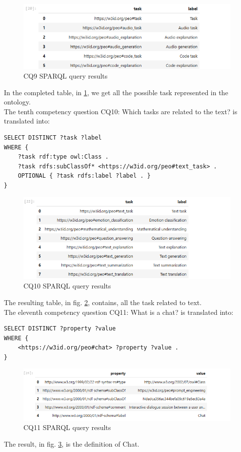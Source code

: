 \begin{figure}[H]
    \centering
    \includegraphics[width=0.9\linewidth]{Figures/fig_55.png}
    \caption{CQ9 SPARQL query results}
    \label{fig:55}
\end{figure}
In the completed table, in \ref{fig:55}, we get all the possible task represented in the ontology.\\

The tenth competency question CQ10: Which tasks are related to the text? is translated into:
\begin{lstlisting}
SELECT DISTINCT ?task ?label
WHERE {
    ?task rdf:type owl:Class .
    ?task rdfs:subClassOf* <https://w3id.org/peo#text_task> .
    OPTIONAL { ?task rdfs:label ?label . }
}
\end{lstlisting}

\begin{figure}[H]
    \centering
    \includegraphics[width=0.9\linewidth]{Figures/fig_56.png}
    \caption{CQ10 SPARQL query results}
    \label{fig:56}
\end{figure}

The resulting table, in fig. \ref{fig:56}, contains, all the task related to text.\\

The eleventh competency question CQ11: What is a chat? is translated into:
\begin{lstlisting}
SELECT DISTINCT ?property ?value
WHERE {
    <https://w3id.org/peo#chat> ?property ?value .
}
\end{lstlisting}

\begin{figure}[H]
    \centering
    \includegraphics[width=0.9\linewidth]{Figures/fig_57.png}
    \caption{CQ11 SPARQL query results}
    \label{fig:57}
\end{figure}
The result, in fig. \ref{fig:57}, is the definition of Chat.\\

